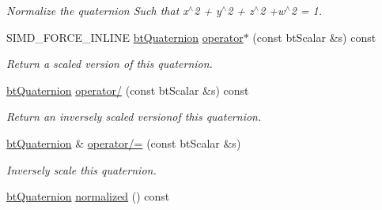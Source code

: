 \begin{DoxyCompactItemize}
\begin{DoxyCompactList}\small\item\em Normalize the quaternion Such that x$^\wedge$2 + y$^\wedge$2 + z$^\wedge$2 +w$^\wedge$2 = 1. \end{DoxyCompactList}\item 
S\+I\+M\+D\+\_\+\+F\+O\+R\+C\+E\+\_\+\+I\+N\+L\+I\+N\+E \hyperlink{classbt_quaternion}{bt\+Quaternion} \hyperlink{classbt_quaternion_acc3942c106bc598c0d4550d30128a7d1}{operator$\ast$} (const bt\+Scalar \&s) const 
\begin{DoxyCompactList}\small\item\em Return a scaled version of this quaternion. \end{DoxyCompactList}\item 
\hyperlink{classbt_quaternion}{bt\+Quaternion} \hyperlink{classbt_quaternion_a4208a1ae41ae01d4dfa0d25792441213}{operator/} (const bt\+Scalar \&s) const 
\begin{DoxyCompactList}\small\item\em Return an inversely scaled versionof this quaternion. \end{DoxyCompactList}\item 
\hyperlink{classbt_quaternion}{bt\+Quaternion} \& \hyperlink{classbt_quaternion_a294fe99e7e5a8e0d45d111334e2e1552}{operator/=} (const bt\+Scalar \&s)
\begin{DoxyCompactList}\small\item\em Inversely scale this quaternion. \end{DoxyCompactList}\item 
\hypertarget{classbt_quaternion_ab74af1c81fd04a63c1697b25a063e507}{\hyperlink{classbt_quaternion}{bt\+Quaternion} \hyperlink{classbt_quaternion_ab74af1c81fd04a63c1697b25a063e507}{normalized} () const }\label{classbt_quaternion_ab74af1c81fd04a63c1697b25a063e507}


\end{DoxyCompactItemize}
